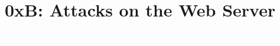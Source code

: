 \documentclass[aspectratio=169]{beamer}
\begin{document}
\section{0xB: Attacks on the Web Server}
{
\begin{frame}
\huge{\textcolor{white}{\textbf{0xB: Attacks on the Web Server}}}
\end{frame}
}
\end{document}
